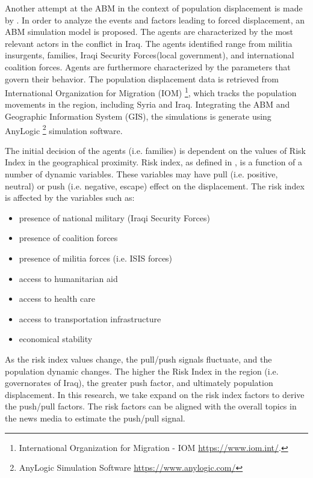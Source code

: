 \begin{appendices}
Another attempt at the ABM in the context of population displacement is made by \cite{asgary2016}. In order to analyze the events and factors leading to forced displacement, an ABM simulation model is proposed. The agents are characterized by the most relevant actors in the conflict in Iraq. The agents identified range from militia insurgents, families, Iraqi Security Forces(local government), and international coalition forces. Agents are furthermore characterized by the parameters that govern their behavior. The population displacement data is retrieved from International Organization for Migration (IOM) \footnote{International Organization for Migration - IOM  \url{https://www.iom.int/}.}, which tracks the population movements in the region, including Syria and Iraq.  Integrating the ABM and Geographic Information System (GIS), the simulations is generate using AnyLogic \footnote{AnyLogic Simulation Software \url{https://www.anylogic.com/}}  simulation software. 

The initial decision of the agents (i.e. families) is dependent on the values of Risk Index in the geographical proximity. Risk index, as defined in \cite{asgary2016}, is a function of a number of dynamic variables. These variables may have pull (i.e. positive, neutral) or push (i.e. negative, escape) effect on the displacement. The risk index is affected by the variables such as:

\begin{itemize}
    \item presence of national military (Iraqi Security Forces)
    \item presence of coalition forces 
    \item presence of militia forces (i.e. ISIS forces)
    \item access to humanitarian aid
    \item access to health care
    \item access to transportation infrastructure
    \item economical stability
\end{itemize}

As the risk index values change, the pull/push signals fluctuate, and the population dynamic changes. The higher the Risk Index in the region (i.e. governorates of Iraq), the greater push factor, and ultimately population displacement. In this research, we take expand on the risk index factors to derive the push/pull factors. The risk factors can be aligned with the overall topics in the news media to estimate the push/pull signal. 



\end{appendices}

